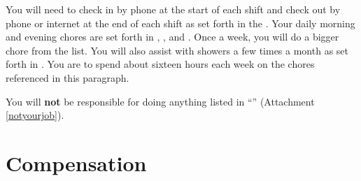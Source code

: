 \documentclass[]{article}
\begin{document}
You will need to check in by phone at the start of each shift and check out by phone or internet at the end of each shift as set forth in the . Your daily morning and evening chores are set forth in \basic{}, \bathroom{}, and \shopping{}. Once a week, you will do a bigger chore from the \bigchores{} list. You will also assist with showers a few times a month as set forth in \shower{}. You are to spend about sixteen hours each week on the chores referenced in this paragraph.

You will \textbf{not} be responsible for doing anything listed in ``\notyourjob{}'' (Attachment \ref{notyourjob}). 

\section{Compensation}
\end{document}
